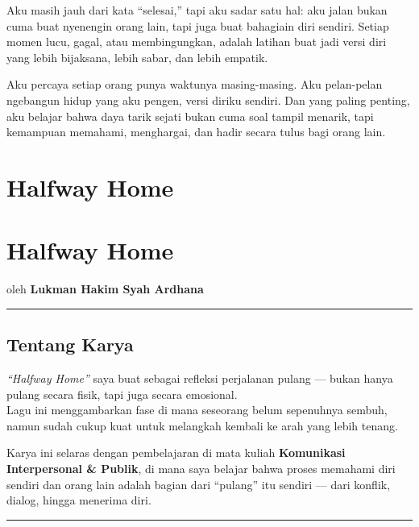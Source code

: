 \documentclass[
  letterpaper,
  DIV=11,
  numbers=noendperiod]{scrreprt}
\begin{document}
Aku masih jauh dari kata ``selesai,'' tapi aku sadar satu hal: aku jalan
bukan cuma buat nyenengin orang lain, tapi juga buat bahagiain diri
sendiri. Setiap momen lucu, gagal, atau membingungkan, adalah latihan
buat jadi versi diri yang lebih bijaksana, lebih sabar, dan lebih
empatik.

Aku percaya setiap orang punya waktunya masing-masing. Aku pelan-pelan
ngebangun hidup yang aku pengen, versi diriku sendiri. Dan yang paling
penting, aku belajar bahwa daya tarik sejati bukan cuma soal tampil
menarik, tapi kemampuan memahami, menghargai, dan hadir secara tulus
bagi orang lain.


\chapter{Halfway Home}\label{halfway-home}


\chapter{Halfway Home 🎵}\label{halfway-home-1}

oleh \textbf{Lukman Hakim Syah Ardhana}

\begin{center}\rule{0.5\linewidth}{0.5pt}\end{center}

\section{Tentang Karya}\label{tentang-karya}

\emph{``Halfway Home''} saya buat sebagai refleksi perjalanan pulang ---
bukan hanya pulang secara fisik, tapi juga secara emosional.\\
Lagu ini menggambarkan fase di mana seseorang belum sepenuhnya sembuh,
namun sudah cukup kuat untuk melangkah kembali ke arah yang lebih
tenang.

Karya ini selaras dengan pembelajaran di mata kuliah \textbf{Komunikasi
Interpersonal \& Publik}, di mana saya belajar bahwa proses memahami
diri sendiri dan orang lain adalah bagian dari ``pulang'' itu sendiri
--- dari konflik, dialog, hingga menerima diri.

\begin{center}\rule{0.5\linewidth}{0.5pt}\end{center}
\end{document}
